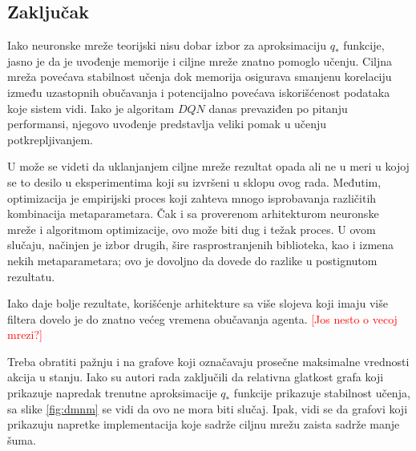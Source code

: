 \subsection{Zaključak}

Iako neuronske mreže teorijski nisu dobar izbor za aproksimaciju $q_*$ funkcije, jasno je da je uvođenje memorije i ciljne mreže znatno pomoglo učenju. Ciljna mreža povećava stabilnost učenja dok memorija osigurava smanjenu korelaciju između uzastopnih obučavanja i potencijalno povećava iskorišćenost podataka koje sistem vidi. Iako je algoritam $DQN$ danas prevaziđen po pitanju performansi, njegovo uvođenje predstavlja veliki pomak u učenju potkrepljivanjem.
\par 
U \cite{dqn_dm} može se videti da uklanjanjem ciljne mreže rezultat opada ali ne u meri u kojoj se to desilo u eksperimentima koji su izvršeni u sklopu ovog rada. Međutim, optimizacija je empirijski proces koji zahteva mnogo isprobavanja različitih kombinacija metaparametara. Čak i sa proverenom arhitekturom neuronske mreže i algoritmom optimizacije, ovo može biti dug i težak proces. U ovom slučaju, načinjen je izbor drugih, šire rasprostranjenih biblioteka, kao i izmena nekih metaparametara; ovo je dovoljno da dovede do razlike u postignutom rezultatu.
\par 
Iako daje bolje rezultate, korišćenje arhitekture sa više slojeva koji imaju više filtera dovelo je do znatno većeg vremena obučavanja agenta. 
\textcolor{red}{[Jos nesto o vecoj mrezi?]}
\par 
Treba obratiti pažnju i na grafove koji označavaju prosečne maksimalne vrednosti akcija u stanju. Iako su autori rada \cite{dqn_mnih} zaključili da relativna glatkost grafa koji prikazuje napredak trenutne aproksimacije $q_*$ funkcije prikazuje stabilnost učenja, sa slike \ref{fig:dmnm} se vidi da ovo ne mora biti slučaj. Ipak, vidi se da grafovi koji prikazuju napretke implementacija koje sadrže ciljnu mrežu zaista sadrže manje šuma.